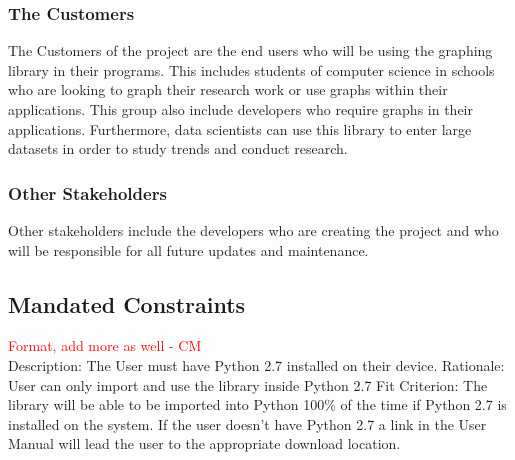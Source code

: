 \documentclass[12pt, titlepage]{article}
\begin{document}
\subsubsection{The Customers}
The Customers of the project are the end users who will be using the graphing library in their programs. This includes students of computer science in schools who are looking to graph their research work or use graphs within their applications. This group also include developers who require graphs in their applications. Furthermore, data scientists can use this library to enter large datasets in order to study trends and conduct research.
\subsubsection{Other Stakeholders}
Other stakeholders include the developers who are creating the project and who will be responsible for all future updates and maintenance.
\subsection{Mandated Constraints}
\textcolor{red}{Format, add more as well - CM} \\
Description: The User must have Python 2.7 installed on their device.
Rationale: User can only import and use the library inside Python 2.7
Fit Criterion: The library will be able to be imported into Python 100\% of the time if Python 2.7 is installed on the system. If the user doesn't have Python 2.7 a link in the User Manual will lead 	the user to the appropriate download location.
\end{document}
